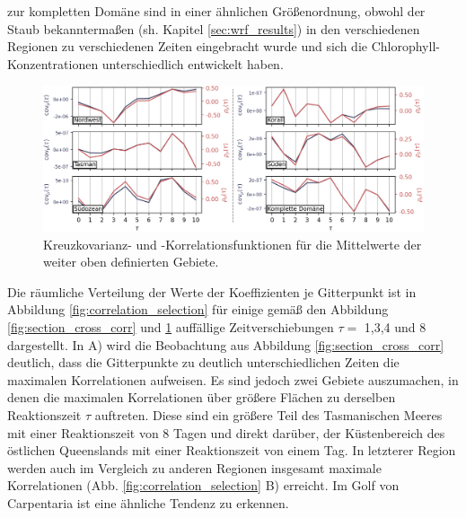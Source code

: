 \documentclass[12pt,a4paper,onecolumn,headheight=30pt]{scrartcl}
\begin{document}
zur kompletten Domäne sind in einer ähnlichen Größenordnung, obwohl der Staub bekanntermaßen (sh. Kapitel \ref{sec:wrf_results}) in den verschiedenen Regionen zu verschiedenen Zeiten eingebracht wurde und sich die Chlorophyll-Konzentrationen unterschiedlich entwickelt haben.
\begin{figure}[htbp]
\includegraphics[width=\textwidth]{bilder/section_means_crosscorr_noadv.png}
\caption{Kreuzkovarianz- und -Korrelationsfunktionen für die Mittelwerte der weiter oben definierten Gebiete.} \label{fig:section_means_cross_corr}
\end{figure}
Die räumliche Verteilung der Werte der Koeffizienten je Gitterpunkt ist in Abbildung \ref{fig:correlation_selection} für einige gemäß den Abbildung \ref{fig:section_cross_corr} und \ref{fig:section_means_cross_corr} auffällige Zeitverschiebungen $\tau=$ 1,3,4 und 8 dargestellt. In A) wird die Beobachtung aus Abbildung \ref{fig:section_cross_corr} deutlich, dass die Gitterpunkte zu deutlich unterschiedlichen Zeiten die maximalen Korrelationen aufweisen. Es sind jedoch zwei Gebiete auszumachen, in denen die maximalen Korrelationen über größere Flächen zu derselben Reaktionszeit $\tau$ auftreten. Diese sind ein größere Teil des Tasmanischen Meeres mit einer Reaktionszeit von 8 Tagen und direkt darüber, der Küstenbereich des östlichen Queenslands mit einer Reaktionszeit von einem Tag. In letzterer Region werden auch im Vergleich zu anderen Regionen insgesamt maximale Korrelationen (Abb. \ref{fig:correlation_selection} B) erreicht. Im Golf von Carpentaria ist eine ähnliche Tendenz zu erkennen. 
\end{document}
